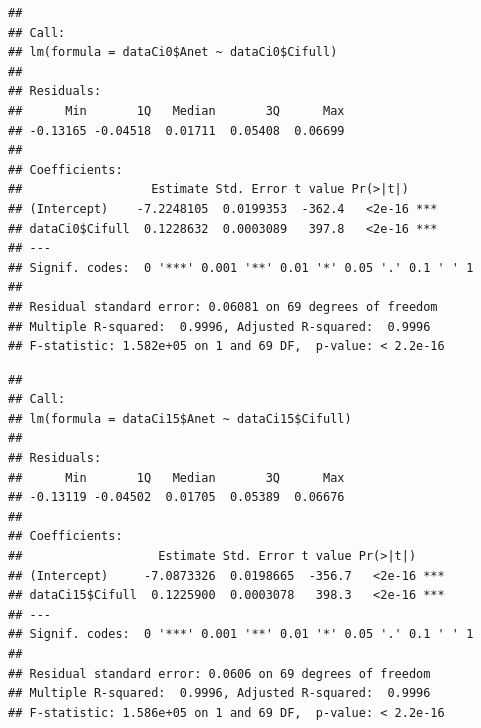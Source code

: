 \documentclass[
]{krantz}
\makeatletter
\newenvironment{Shaded}{\begin{snugshade}}{\end{snugshade}}
\newcommand{\CommentTok}[1]{\textcolor[rgb]{0.56,0.35,0.01}{\textit{#1}}}
\newcommand{\DecValTok}[1]{\textcolor[rgb]{0.00,0.00,0.81}{#1}}
\newcommand{\FunctionTok}[1]{\textcolor[rgb]{0.00,0.00,0.00}{#1}}
\newcommand{\NormalTok}[1]{#1}
\newcommand{\OtherTok}[1]{\textcolor[rgb]{0.56,0.35,0.01}{#1}}
\newcommand{\SpecialCharTok}[1]{\textcolor[rgb]{0.00,0.00,0.00}{#1}}
\newenvironment{kframe}{%
\medskip{}
\setlength{\fboxsep}{.8em}
 \def\at@end@of@kframe{}%
 \ifinner\ifhmode%
  \def\at@end@of@kframe{\end{minipage}}%
  \begin{minipage}{\columnwidth}%
 \fi\fi%
 \def\FrameCommand##1{\hskip\@totalleftmargin \hskip-\fboxsep
 \colorbox{shadecolor}{##1}\hskip-\fboxsep
     \hskip-\linewidth \hskip-\@totalleftmargin \hskip\columnwidth}%
 \MakeFramed {\advance\hsize-\width
   \@totalleftmargin\z@ \linewidth\hsize
   \@setminipage}}%
 {\par\unskip\endMakeFramed%
 \at@end@of@kframe}
\renewenvironment{Shaded}{\begin{kframe}}{\end{kframe}}
\makeatother
\begin{document}
\begin{verbatim}
## 
## Call:
## lm(formula = dataCi0$Anet ~ dataCi0$Cifull)
## 
## Residuals:
##      Min       1Q   Median       3Q      Max 
## -0.13165 -0.04518  0.01711  0.05408  0.06699 
## 
## Coefficients:
##                  Estimate Std. Error t value Pr(>|t|)    
## (Intercept)    -7.2248105  0.0199353  -362.4   <2e-16 ***
## dataCi0$Cifull  0.1228632  0.0003089   397.8   <2e-16 ***
## ---
## Signif. codes:  0 '***' 0.001 '**' 0.01 '*' 0.05 '.' 0.1 ' ' 1
## 
## Residual standard error: 0.06081 on 69 degrees of freedom
## Multiple R-squared:  0.9996, Adjusted R-squared:  0.9996 
## F-statistic: 1.582e+05 on 1 and 69 DF,  p-value: < 2.2e-16
\end{verbatim}

\begin{Shaded}
\end{Shaded}

\begin{verbatim}
## 
## Call:
## lm(formula = dataCi15$Anet ~ dataCi15$Cifull)
## 
## Residuals:
##      Min       1Q   Median       3Q      Max 
## -0.13119 -0.04502  0.01705  0.05389  0.06676 
## 
## Coefficients:
##                   Estimate Std. Error t value Pr(>|t|)    
## (Intercept)     -7.0873326  0.0198665  -356.7   <2e-16 ***
## dataCi15$Cifull  0.1225900  0.0003078   398.3   <2e-16 ***
## ---
## Signif. codes:  0 '***' 0.001 '**' 0.01 '*' 0.05 '.' 0.1 ' ' 1
## 
## Residual standard error: 0.0606 on 69 degrees of freedom
## Multiple R-squared:  0.9996, Adjusted R-squared:  0.9996 
## F-statistic: 1.586e+05 on 1 and 69 DF,  p-value: < 2.2e-16
\end{verbatim}

\begin{Shaded}
\end{Shaded}
\end{document}

